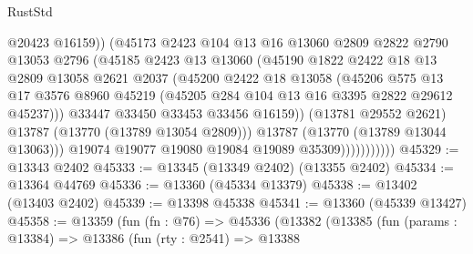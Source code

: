 \begin{lexlean}{RustStd}
\begin{coremodule}
                                @20423
                                @16159))
                            (@45173
                              @2423
                              @104
                              @13
                              @16
                              @13060
                              @2809
                              @2822
                              @2790
                              @13053
                              @2796
                              (@45185
                                @2423
                                @13
                                @13060
                                (@45190
                                  @1822
                                  @2422
                                  @18
                                  @13
                                  @2809
                                  @13058
                                  @2621
                                  @2037
                                  (@45200
                                    @2422
                                    @18
                                    @13058
                                    (@45206
                                      @575
                                      @13
                                      @17
                                      @3576
                                      @8960
                                      @45219
                                      (@45205 @284 @104 @13 @16 @3395 @2822 @29612 @45237)))
                                  @33447
                                  @33450
                                  @33453
                                  @33456
                                  @16159))
                              (@13781 @29552 @2621)
                              @13787
                              (@13770 (@13789 @13054 @2809)))
                            @13787
                            (@13770 (@13789 @13044 @13063)))
                          @19074
                          @19077
                          @19080
                          @19084
                          @19089
                          @35309)))))))))))
@45329 := @13343 @2402
@45333 := @13345 (@13349 @2402) (@13355 @2402)
@45334 := @13364 @44769
@45336 := @13360 (@45334 @13379)
@45338 := @13402 (@13403 @2402)
@45339 := @13398 @45338
@45341 := @13360 (@45339 @13427)
@45358 := @13359
    (fun (fn : @76) =>
    @45336
      (@13382
        (@13385
          (fun (params : @13384) =>
          @13386
            (fun (rty : @2541) =>
            @13388

\end{coremodule}
\end{lexlean}
